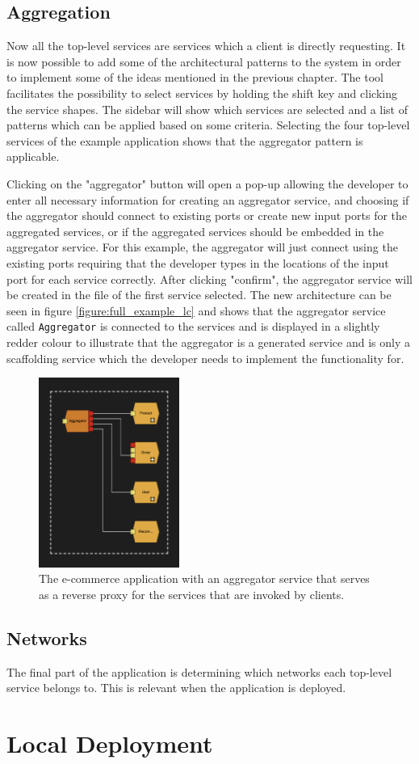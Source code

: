 \subsection{Aggregation}
Now all the top-level services are services which a client is directly requesting. It is now possible to add some of the architectural patterns to the system in order to implement some of the ideas mentioned in the previous chapter.
The tool facilitates the possibility to select services by holding the shift key and clicking the service shapes. The sidebar will show which services are selected and a list of patterns which can be applied based on some
criteria. Selecting the four top-level services of the example application shows that the aggregator pattern is applicable.

Clicking on the "aggregator" button will open a pop-up allowing the developer to enter all necessary information for creating an aggregator service, and choosing if the aggregator should connect to existing ports or create new input ports for the aggregated services, or if the aggregated services should be embedded in the aggregator service.
For this example, the aggregator will just connect using the existing ports requiring that the developer types in the locations of the input port for each service correctly.
After clicking "confirm", the aggregator service will be created in the file of the first service selected. The new architecture can be seen in figure \ref*{figure:full_example_lc} and shows that the aggregator service called \texttt{Aggregator} is connected to the services and is displayed in a slightly redder colour 
to illustrate that the aggregator is a generated service and is only a scaffolding service which the developer needs to implement the functionality for.

\begin{figure}[h!]
    \center
    \includegraphics[width=0.41\textwidth]{figures/jv_aggregator.png}
    \caption{The e-commerce application with an aggregator service that serves as a reverse proxy for the services that are invoked by clients.}
    \label{figure:jv_aggregate}
\end{figure}

\subsection{Networks}
The final part of the application is determining which networks each top-level service belongs to. This is relevant when the application is deployed.
\section{Local Deployment}